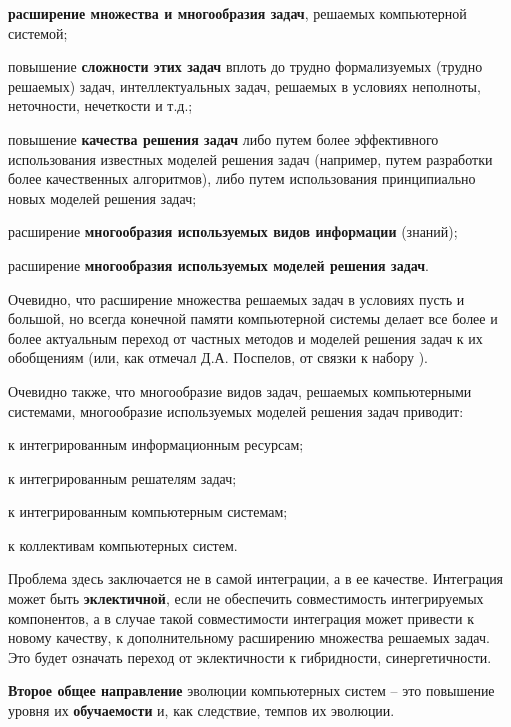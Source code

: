 \begin{SCn}
{\begin{scnitemize}
    \item \textbf{расширение множества и многообразия задач}, решаемых компьютерной системой; 
    \item повышение \textbf{сложности этих задач} вплоть до трудно формализуемых (трудно решаемых) задач, интеллектуальных задач, решаемых в условиях неполноты, неточности, нечеткости и т.д.;
    \item повышение \textbf{качества решения задач} либо путем более эффективного использования известных моделей решения задач (например, путем разработки более качественных алгоритмов), либо путем использования принципиально новых моделей решения задач;
    \item расширение \textbf{многообразия используемых видов информации} (знаний);
    \item расширение \textbf{многообразия используемых моделей решения задач}.
\end{scnitemize}

Очевидно, что расширение множества решаемых задач в условиях пусть и большой, но всегда конечной памяти компьютерной системы делает все более и более актуальным переход от частных методов и моделей решения задач к их обобщениям (или, как отмечал Д.А. Поспелов, от связки  к набору ).

Очевидно также, что многообразие видов задач, решаемых компьютерными системами, многообразие используемых моделей решения задач приводит: 
\begin{scnitemize}
    \item к интегрированным информационным ресурсам;
    \item к интегрированным решателям задач;
    \item к интегрированным компьютерным системам;
    \item к коллективам компьютерных систем.
\end{scnitemize}

Проблема здесь заключается не в самой интеграции, а в ее качестве. Интеграция может быть \textbf{эклектичной}, если не обеспечить совместимость интегрируемых компонентов, а в случае такой совместимости интеграция может привести к новому качеству, к дополнительному расширению множества решаемых задач. Это будет означать переход от эклектичности к гибридности, синергетичности.

\textbf{Второе общее направление} эволюции компьютерных систем -- это повышение уровня их \textbf{обучаемости} и, как следствие, темпов их эволюции.

}
\end{SCn}
